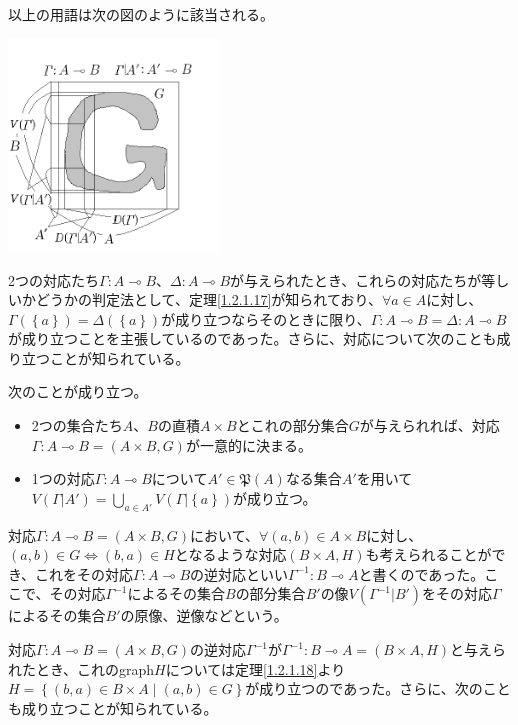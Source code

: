 \documentclass[dvipdfmx]{jsarticle}
\begin{document}
以上の用語は次の図のように該当される。
\begin{center}
\includegraphics[width=160pt]{1.2.1.a.png}
\end{center}
2つの対応たち$\varGamma:A \multimap B$、$\varDelta:A \multimap B$が与えられたとき、これらの対応たちが等しいかどうかの判定法として、定理\ref{1.2.1.17}が知られており、$\forall a \in A$に対し、$\varGamma\left( \left\{ a \right\} \right) = \varDelta\left( \left\{ a \right\} \right)$が成り立つならそのときに限り、$\varGamma:A \multimap B = \varDelta:A \multimap B$が成り立つことを主張しているのであった。さらに、対応について次のことも成り立つことが知られている。
\begin{thm*}
次のことが成り立つ。
\begin{itemize}
\item
  2つの集合たち$A$、$B$の直積$A \times B$とこれの部分集合$G$が与えられれば、対応$\varGamma:A \multimap B = (A \times B,G)$が一意的に決まる。
\item
  1つの対応$\varGamma:A \multimap B$について$A'\in \mathfrak{P}(A)$なる集合$A'$を用いて$V\left( \varGamma|A' \right) = \bigcup_{a \in A'} {V\left( \varGamma|\left\{ a \right\} \right)}$が成り立つ。
\end{itemize}
\end{thm*}
対応$\varGamma:A \multimap B = (A \times B,G)$において、$\forall(a,b) \in A \times B$に対し、$(a,b) \in G \Leftrightarrow (b,a) \in H$となるような対応$(B \times A,H)$も考えられることができ、これをその対応$\varGamma:A \multimap B$の逆対応といい$\varGamma^{- 1}:B \multimap A$と書くのであった。ここで、その対応$\varGamma^{- 1}$によるその集合$B$の部分集合$B'$の像$V\left( \varGamma^{- 1}|B' \right)$をその対応$\varGamma$によるその集合$B'$の原像、逆像などという。\par
対応$\varGamma:A \multimap B = (A \times B,G)$の逆対応$\varGamma^{- 1}$が$\varGamma^{- 1}:B \multimap A = (B \times A,H)$と与えられたとき、これのgraph$H$については定理\ref{1.2.1.18}より$H = \left\{ (b,a) \in B \times A \middle| (a,b) \in G \right\}$が成り立つのであった。さらに、次のことも成り立つことが知られている。
\end{document}
